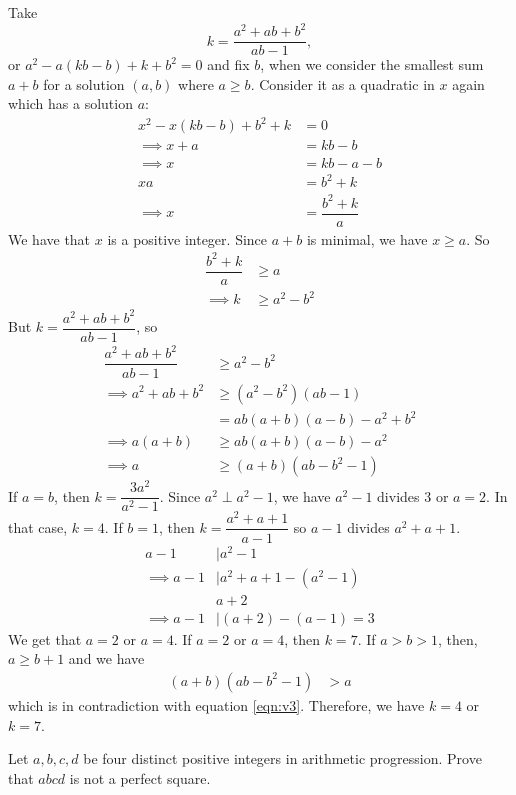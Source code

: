 \begin{solution}
	Take \[k=\dfrac{a^2+ab+b^2}{ab-1},\] or $a^2-a(kb-b)+k+b^2=0$ and fix $b$, when we consider the smallest sum $a+b$ for a solution $(a,b)$ where $a\geq b$. Consider it as a quadratic in $x$ again which has a solution $a$:
		\begin{align*}
			x^2-x(kb-b)+b^2+k
				& = 0\\
			\implies x+a
				& = kb-b\\
			\implies x
				& = kb-a-b\\
		 xa
			 	& =b^2+k\\
		 \implies x
			 	& = \dfrac{b^2+k}{a}
		\end{align*}
	We have that $x$ is a positive integer. Since $a+b$ is minimal, we have $x\geq a$. So
		\begin{align*}
			\dfrac{b^2+k}{a}
				& \geq a\\
			\implies k
				& \geq a^2-b^2
		\end{align*}
	But $k=\dfrac{a^2+ab+b^2}{ab-1}$, so
		\begin{align}
			\dfrac{a^2+ab+b^2}{ab-1}
				& \geq a^2-b^2\nonumber\\
			\implies a^2+ab+b^2
				& \geq (a^2-b^2)(ab-1)\\
				& = ab(a+b)(a-b)-a^2+b^2\nonumber\\
			\implies a(a+b)
				& \geq ab(a+b)(a-b)-a^2\nonumber\\
			\implies a
				& \geq (a+b)(ab-b^2-1)\label{eqn:v3}
		\end{align}
	If $a=b$, then $k=\dfrac{3a^2}{a^2-1}$. Since $a^2\perp a^2-1$, we have $a^2-1$ divides $3$ or $a=2$. In that case, $k=4$. If $b=1$, then $k=\dfrac{a^2+a+1}{a-1}$ so $a-1$ divides $a^2+a+1$.
		\begin{align*}
			a-1
				& \mid a^2-1\\
			\implies a-1
				& \mid a^2+a+1-(a^2-1)\\
				& a+2\\
			\implies a-1
				& \mid (a+2)-(a-1)=3
		\end{align*}
	We get that $a=2$ or $a=4$. If $a=2$ or $a=4$, then $k=7$. If $a>b>1$, then, $a\geq b+1$ and we have
		\begin{align*}
			(a+b)(ab-b^2-1) & > a
		\end{align*}
	which is in contradiction with equation \eqref{eqn:v3}. Therefore, we have $k=4$ or $k=7$.
\end{solution}

\begin{problem}
	Let $ a,b,c,d$ be four distinct positive integers in arithmetic progression. Prove that $ abcd$ is not a perfect square.
\end{problem}
